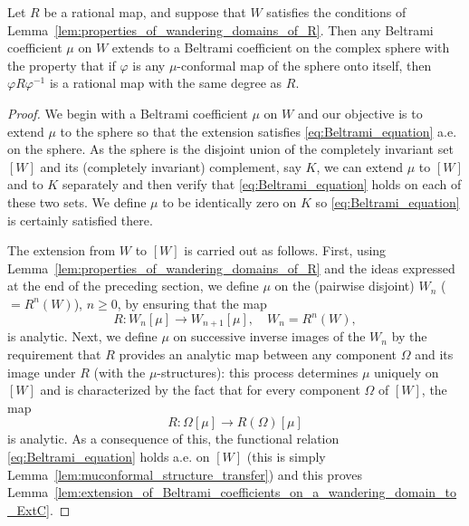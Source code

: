 \begin{lemma}
    \label{lem:extension_of_Beltrami_coefficients_on_a_wandering_domain_to_ExtC}
    Let $R$ be a rational map, and suppose that $W$ satisfies the conditions of
    Lemma~\ref{lem:properties_of_wandering_domains_of_R}. Then any Beltrami
    coefficient $\mu$ on $W$ extends to a Beltrami coefficient on the complex
    sphere with the property that if $\varphi$ is any $\mu$-conformal map of the
    sphere onto itself, then $\varphi R \varphi^{-1}$ is a rational map with the
    same degree as $R$.
\end{lemma}
\begin{proof}
    We begin with a Beltrami coefficient $\mu$ on $W$ and our objective is to
    extend $\mu$ to the sphere so that the extension satisfies
    \eqref{eq:Beltrami_equation} a.e. on the sphere. As the sphere is the
    disjoint union of the completely invariant set $[W]$ and its (completely
    invariant) complement, say $K$, we can extend $\mu$ to $[W]$ and to $K$
    separately and then verify that \eqref{eq:Beltrami_equation} holds on each
    of these two sets. We define $\mu$ to be identically zero on $K$ so
    \eqref{eq:Beltrami_equation} is certainly satisfied there.

    The extension from $W$ to $[W]$ is carried out as follows. First, using
    Lemma~\ref{lem:properties_of_wandering_domains_of_R} and the ideas expressed
    at the end of the preceding section, we define $\mu$ on the (pairwise
    disjoint) $W_n$ ($= R^n(W)$), $n \geq 0$, by ensuring that the map
    \begin{equation*}
        R: W_n[\mu] \to W_{n+1}[\mu], \quad W_n = R^n(W),
    \end{equation*}
    is analytic. Next, we define $\mu$ on successive inverse images of the $W_n$
    by the requirement that $R$ provides an analytic map between any component
    $\Omega$ and its image under $R$ (with the $\mu$-structures): this process
    determines $\mu$ uniquely on $[W]$ and is characterized by the fact that for
    every component $\Omega$ of $[W]$, the map
    \begin{equation*}
        R: \Omega[\mu] \to R(\Omega)[\mu]
    \end{equation*}
    is analytic. As a consequence of this, the functional relation
    \eqref{eq:Beltrami_equation} holds a.e. on $[W]$ (this is simply
    Lemma~\ref{lem:muconformal_structure_transfer}) and this proves
    Lemma~\ref{lem:extension_of_Beltrami_coefficients_on_a_wandering_domain_to_ExtC}.
\end{proof}

